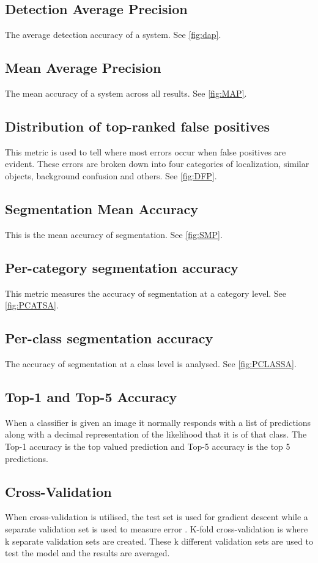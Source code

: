 \subsection*{Detection Average Precision}
The average detection accuracy of a system. See \ref{fig:dap}.

\subsection*{Mean Average Precision}
The mean accuracy of a system across all results. See \ref{fig:MAP}.
		
\subsection*{Distribution of top-ranked false positives}
This metric is used to tell where most errors occur when false positives are
evident. These errors are broken down into four categories of localization,
similar objects, background confusion and others. See \ref{fig:DFP}.

\subsection*{Segmentation Mean Accuracy}
This is the mean accuracy of segmentation. See \ref{fig:SMP}.

\subsection*{Per-category segmentation accuracy}
This metric measures the accuracy of segmentation at a category level. See \ref{fig:PCATSA}.	

\subsection*{Per-class segmentation accuracy}
The accuracy of segmentation at a class level is analysed. See \ref{fig:PCLASSA}.

\subsection*{Top-1 and Top-5 Accuracy}
When a classifier is given an image it normally responds with a list of
predictions along with a decimal representation of the likelihood that it is of
that class. The Top-1 accuracy is the top valued prediction and Top-5 accuracy
is the top 5 predictions.

\subsection*{Cross-Validation}
When cross-validation is utilised, the test set is used for gradient descent while a separate validation set is used to measure error \parencite{MLANN}.
K-fold cross-validation is where k separate validation sets are created.
These k different validation sets are used to test the model and the results are averaged.

